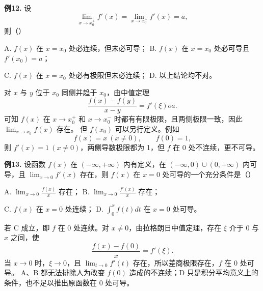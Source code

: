 \begin{problemblock}
\textbf{例12.} 设
\[
\lim_{x\to x_0^+}f'(x)=\lim_{x\to x_0^-}f'(x)=a,
\]
则（\quad）

A. \(f(x)\) 在 \(x=x_0\) 处必连续，但未必可导；
B. \(f(x)\) 在 \(x=x_0\) 处必可导且 \(f'(x_0)=a\)；

C. \(f(x)\) 在 \(x=x_0\) 处必有极限但未必连续；
D. 以上结论均不对。
\end{problemblock}
\begin{solutionblock}
对 \(x\) 与 \(y\) 位于 \(x_0\) 同侧并趋于 \(x_0\)，由中值定理
\[
\frac{f(x)-f(y)}{x-y}=f'(\xi)	o a.
\]
可知 \(f(x)\) 在 \(x\to x_0^+\) 和 \(x\to x_0^-\) 时都有有限极限，且两侧极限一致，因此 \(\lim_{x\to x_0}f(x)\) 存在。
但 \(f(x_0)\) 可以另行定义。例如
\[
f(x)=x\ (x\ne0),\qquad f(0)=1,
\]
则 \(f'(x)=1\ (x\ne0)\)，两侧导数极限都为 1，但 \(f\) 在 0 处不连续，更不可导。
\end{solutionblock}

\begin{problemblock}
\textbf{例13.} 设函数 \(f(x)\) 在 \((-
\infty,+\infty)\) 内有定义，在 \((-
\infty,0)\cup(0,+\infty)\) 内可导，且 \(\lim_{x\to0}f'(x)\) 存在，则 \(f(x)\) 在 \(x=0\) 处可导的一个充分条件是（\quad）

A. \(\displaystyle\lim_{x\to0}\frac{f(x)}x\) 存在；
B. \(\displaystyle\lim_{x\to0}\frac{f'(x)}x\) 存在；

C. \(f(x)\) 在 \(x=0\) 处连续；
D. \(\displaystyle\int_0^x f(t)dt\) 在 \(x=0\) 处可导。
\end{problemblock}
\begin{solutionblock}
若 C 成立，即 \(f\) 在 0 处连续。对 \(x\ne0\)，由拉格朗日中值定理，存在 \(\xi\) 介于 0 与 \(x\) 之间，使
\[
\frac{f(x)-f(0)}x=f'(\xi).
\]
当 \(x\to0\) 时，\(\xi\to0\)，且 \(\lim_{t\to0}f'(t)\) 存在，所以差商极限存在，\(f\) 在 0 处可导。
A、B 都无法排除人为改变 \(f(0)\) 造成的不连续；D 只是积分平均意义上的条件，也不足以推出原函数在 0 处可导。
\end{solutionblock}

